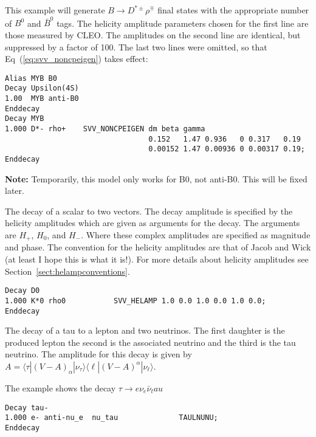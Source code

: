 \Example
This example will generate $B \rightarrow D^{*\pm} \rho^\mp$ 
final states with the appropriate number of $B^0$ and $\bar B^0$ tags.
The helicity amplitude parameters chosen for the first line are those
measured by CLEO. The amplitudes on the second line are identical, but
suppressed by a factor of 100. The last two lines were omitted, so that
Eq~(\ref{eq:svv_noncpeigen}) takes effect:
\begin{verbatim}
Alias MYB B0
Decay Upsilon(4S)
1.00  MYB anti-B0
Enddecay
Decay MYB
1.000 D*- rho+    SVV_NONCPEIGEN dm beta gamma  
                                 0.152   1.47 0.936   0 0.317   0.19 
                                 0.00152 1.47 0.00936 0 0.00317 0.19; 
Enddecay
\end{verbatim}

{\bf Note:} Temporarily, this model only works for B0, not anti-B0. This
will be fixed later.



\label{svvhelamp}



\Expl
The decay of a scalar to two vectors. The decay amplitude is
specified by the helicity amplitudes which are given as  arguments
for the decay. The arguments are $H_+$, $H_0$, and $H_-$. Where
these complex amplitudes are specified as magnitude and phase.
The convention for the helicity amplitudes are that of 
Jacob and Wick (at least I hope this is what it is!).
For more details about helicity amplitudes see 
Section~\ref{sect:helampconventions}.

\Example
\begin{verbatim}
Decay D0
1.000 K*0 rho0           SVV_HELAMP 1.0 0.0 1.0 0.0 1.0 0.0;
Enddecay
\end{verbatim}









\Expl
The decay of a tau to a lepton and two neutrinos. The first
daughter is the produced lepton the second is the associated
neutrino and the third is the tau neutrino. 
The amplitude for this decay is given by 
$A=\langle \tau | (V-A)_{\alpha} | \nu_{\tau} \rangle
   \langle \ell | (V-A)^{\alpha} | \nu_{\ell} \rangle$.
 

\Example
The example shows the decay $\tau\rightarrow e\nu_{e}\bar\nu_tau$
\begin{verbatim}
Decay tau-
1.000 e- anti-nu_e  nu_tau              TAULNUNU;
Enddecay
\end{verbatim}





